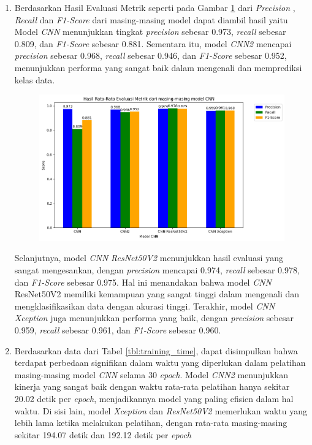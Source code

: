 \begin{enumerate}[nolistsep]
\item Berdasarkan Hasil Evaluasi Metrik seperti pada Gambar \ref{fig:GrafikPerbandinganEvaluasiMetrik} dari \textit{Precision} , \textit{Recall} dan \textit{F1-Score} dari masing-masing model dapat diambil hasil yaitu Model \textit{CNN} menunjukkan tingkat \textit{precision} sebesar 0.973, \textit{recall} sebesar 0.809, dan \textit{F1-Score} sebesar 0.881. Sementara itu, model \textit{CNN2} mencapai \textit{precision} sebesar 0.968, \textit{recall} sebesar 0.946, dan \textit{F1-Score} sebesar 0.952, menunjukkan performa yang sangat baik dalam mengenali dan memprediksi kelas data.
\begin{figure}[!hbt]
	\centering
	\includegraphics[width=0.7\linewidth]{gambar/bener/RataRataEvaluasiMetrik.png}
	\label{fig:GrafikPerbandinganEvaluasiMetrik}
\end{figure}
Selanjutnya, model \textit{CNN} \textit{ResNet50V2} menunjukkan hasil evaluasi yang sangat mengesankan, dengan \textit{precision} mencapai 0.974, \textit{recall} sebesar 0.978, dan \textit{F1-Score} sebesar 0.975. Hal ini menandakan bahwa model \textit{CNN} ResNet50V2 memiliki kemampuan yang sangat tinggi dalam mengenali dan mengklasifikasikan data dengan akurasi tinggi. Terakhir, model \textit{CNN} \textit{Xception} juga menunjukkan performa yang baik, dengan \textit{precision} sebesar 0.959, \textit{recall} sebesar 0.961, dan \textit{F1-Score} sebesar 0.960.

\item Berdasarkan data dari Tabel \ref{tbl:training_time}, dapat disimpulkan bahwa terdapat perbedaan signifikan dalam waktu yang diperlukan dalam pelatihan masing-masing model \textit{CNN} selama 30 \textit{epoch}. Model \textit{CNN2} menunjukkan kinerja yang sangat baik dengan waktu rata-rata pelatihan hanya sekitar 20.02 detik per \textit{epoch}, menjadikannya model yang paling efisien dalam hal waktu. Di sisi lain, model \textit{Xception} dan \textit{ResNet50V2} memerlukan waktu yang lebih lama ketika melakukan pelatihan, dengan rata-rata masing-masing sekitar 194.07 detik dan 192.12 detik per \textit{epoch}
\end{enumerate}

